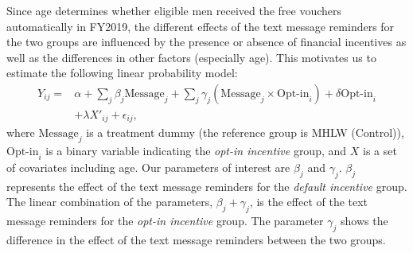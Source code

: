 \documentclass[
  11pt,
  a4paper
]{article}
\begin{document}
Since age determines whether eligible men received the free vouchers automatically in FY2019, the different effects of the text message reminders for the two groups are influenced by the presence or absence of financial incentives as well as the differences in other factors (especially age). This motivates us to estimate the following linear probability model:
\begin{equation}
\begin{split}
Y_{ij} = &\alpha + \sum_j \beta_j \text{Message}_j + \sum_j \gamma_j (\text{Message}_j \times \text{Opt-in}_i) + \delta \text{Opt-in}_i \\
&+ \lambda X'_{ij} + \epsilon_{ij},
\end{split} \label{eq:regression}
\end{equation}
where \(\text{Message}_j\) is a treatment dummy (the reference group is MHLW (Control)), \(\text{Opt-in}_i\) is a binary variable indicating the \emph{opt-in incentive} group, and \(X\) is a set of covariates including age. Our parameters of interest are \(\beta_j\) and \(\gamma_j\). \(\beta_j\) represents the effect of the text message reminders for the \emph{default incentive} group. The linear combination of the parameters, \(\beta_j + \gamma_j\), is the effect of the text message reminders for the \emph{opt-in incentive} group. The parameter \(\gamma_j\) shows the difference in the effect of the text message reminders between the two groups.
\end{document}

